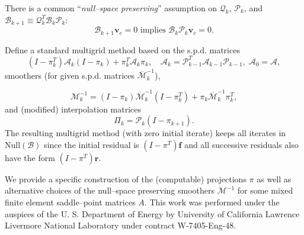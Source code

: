 \documentclass{report}
\begin{document}
There is a common ``{\it null--space preserving}'' assumption on
${\mathcal Q}_k$, ${\mathcal P}_k$, and
${\mathcal B}_{k+1} \equiv {\mathcal Q}^T_k {\mathcal B}_k {\mathcal
P}_k$:
$$
{\mathcal B}_{k+1} {\mathbf v}_c =0
\text{ implies }
{\mathcal B}_k {\mathcal P}_k {\mathbf v}_c = 0.
$$

Define a standard multigrid method based on the s.p.d. matrices
$$
(I-\pi^T_k){\mathcal A}_k(I-\pi_k) + \pi^T_k {\mathcal A}_k \pi_k,
\quad {\mathcal A}_k =
{\mathcal P}^T_{k-1} {\mathcal A}_{k-1} {\mathcal P}_{k-1},\;
{\mathcal A}_0 = {\mathcal A},
$$
smoothers (for given s.p.d. matrices ${\overline {\mathcal M}}^{-1}_k$),

$$
{\mathcal M}^{-1}_k = (I-\pi_k){\overline {\mathcal M}}^{-1}_k
(I-\pi^T_k)+ \pi_k {\overline {\mathcal M}}^{-1}_k\pi^T_k,
$$
and (modified)
interpolation matrices
$$
\Pi_k={\mathcal P}_k (I-\pi_{k+1}).
$$
The resulting multigrid method (with zero initial iterate)
keeps all iterates in
$\text{Null}({\mathcal B})$ since the initial residual is
$(I-\pi^T){\mathbf f}$ and all successive residuals also have the form
$(I-\pi^T){\mathbf r}$.

We provide a specific construction of the (computable) projections
$\pi$ as well as
alternative choices of the null--space preserving smoothers
${\mathcal M}^{-1}$
for some mixed finite element saddle--point matrices $A$.
\vspace{0.5cm}
This work was performed under the auspices of the U. S.
Department of
Energy by University of California Lawrence Livermore National
Laboratory
under contract W-7405-Eng-48.
\end{document}
